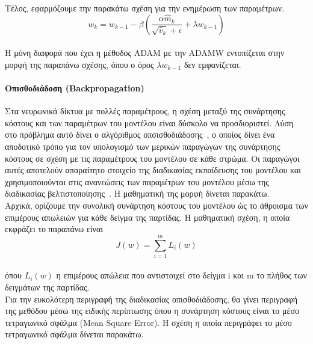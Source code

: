 \documentclass[12pt]{article}
\numberwithin{equation}{section}
\begin{document}
\noindent Τέλος, εφαρμόζουμε την παρακάτω σχέση για την ενημέρωση των παραμέτρων.\\

\begin{equation}
w_{k} = w_{k-1} - \beta \left( \frac{\alpha \hat{m}_k}{\sqrt{\hat{v}_k} + \epsilon} + \lambda w_{k-1} \right)
\end{equation}\\

\noindent Η μόνη διαφορά που έχει η μέθοδος ADAM με την ADAMW εντοπίζεται στην μορφή της παραπάνω σχέσης, όπου ο όρος \(\lambda w_{k-1}\) δεν εμφανίζεται.\\

\paragraph{Οπισθοδιάδοση (Backpropagation) \\ [0.5 cm]}

Στα νευρωνικά δίκτυα με πολλές παραμέτρους, η σχέση μεταξύ της συνάρτησης κόστους και των παραμέτρων του μοντέλου είναι δύσκολο να προσδιοριστεί. Λύση στο πρόβλημα αυτό δίνει ο αλγόριθμος οπσισθοδιάδοσης~\cite{bishop2006pattern}, ο οποίος δίνει ένα αποδοτικό τρόπο για τον υπολογισμό των μερικών παραγώγων της συνάρτησης κόστους σε σχέση με τις παραμέτρους του μοντέλου σε κάθε στρώμα. Οι παραγώγοι αυτές αποτελούν απαραίτητο στοιχείο της διαδικασίας εκπαίδευσης του μοντέλου και χρησιμοποιούνται στις ανανεώσεις των παραμέτρων του μοντέλου μέσω της διαδικασίας βελτιστοποίησης~\cite{higham2018deeplearningintroductionapplied}. Η μαθηματική της μορφή δίνεται παρακάτω. \\

Αρχικά, ορίζουμε την συνολική συνάρτηση κόστους του μοντέλου ώς το άθροισμα των επιμέρους απωλειών για κάθε δείγμα της παρτίδας. Η μαθηματική σχέση, η οποία εκφράζει το παραπάνω είναι\\

\begin{equation}
J(w) = \sum_{i=1}^{m} L_i(w)
\end{equation}\\

\noindent όπου \(L_i(w)\) η επιμέρους απώλεια που αντιστοιχεί στο δείγμα i και m το πλήθος των δειγμάτων της παρτίδας.\\

Για την ευκολότερη περιγραφή της διαδικασίας οπισθοδιάδοσης, θα γίνει περιγραφή της μεθόδου μέσω της ειδικής περίπτωσης όπου η συνάρτηση κόστους είναι το μέσο τετραγωνικό σφάλμα (Mean Square Error). Η σχέση η οποία περιγράφει το μέσο τετραγωνικό σφάλμα δίνεται παρακάτω.\\
\end{document}
